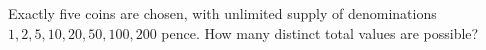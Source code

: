 Exactly five coins are chosen, with unlimited supply of denominations $ 1,2,5,10,20,50,100,200 $ pence. How many distinct total values are possible?
